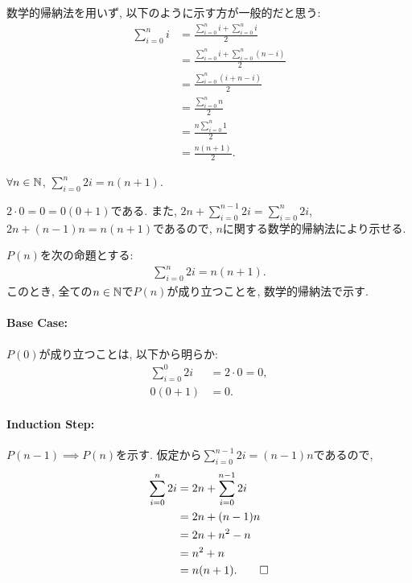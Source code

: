 \begin{rem}
  数学的帰納法を用いず, 以下のように示す方が一般的だと思う:
  \begin{align*}
    \sum_{i=0}^{n}i&=\frac{\sum_{i=0}^{n}i + \sum_{i=0}^{n}i}{2}\\
    &=\frac{\sum_{i=0}^{n}i + \sum_{i=0}^{n}(n-i)}{2}\\
    &=\frac{\sum_{i=0}^{n}(i + n-i)}{2}\\
    &=\frac{\sum_{i=0}^{n}n}{2}\\
    &=\frac{n\sum_{i=0}^{n}1}{2}\\
    &=\frac{n(n+1)}{2}.
  \end{align*}
\end{rem}

\begin{prop}
  $\forall n\in\mathbb{N}$,
  $\sum_{i=0}^{n}2i=n(n+1).$
\end{prop}
\begin{proof**}
  $2\cdot 0=0=0(0+1)$である.
  また,
  $2n+\sum_{i=0}^{n-1}2i=\sum_{i=0}^{n}2i$,
  $2n+(n-1)n=n(n+1)$であるので,
  $n$に関する数学的帰納法により示せる.
\end{proof**}


\begin{proof*}
  $P(n)$を次の命題とする:
  \begin{align*}
    \sum_{i=0}^{n}2i=n(n+1).
  \end{align*}
  このとき, 全ての$n\in\mathbb{N}$で$P(n)$が成り立つことを,
  数学的帰納法で示す.

  \paragraph{Base Case:}
  $P(0)$が成り立つことは, 以下から明らか:
  \begin{align*}
    \sum_{i=0}^{0}2i&=2\cdot 0=0,\\
    0(0+1)&=0.
  \end{align*}

  \paragraph{Induction Step:}
  $P(n-1)\implies P(n)$を示す.
  仮定から$\sum_{i=0}^{n-1}2i=(n-1)n$であるので,
  \begin{align*}
    \sum_{i=0}^{n}2i&=2n+\sum_{i=0}^{n-1}2i\\
    &=2n+(n-1)n\\
    &=2n+n^2-n\\
    &=n^2+n\\
    &=n(n+1).
    \qedhere
  \end{align*}
\end{proof*}

